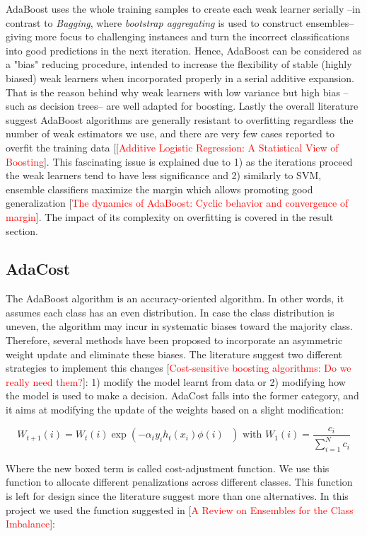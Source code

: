 \documentclass[conference]{IEEEtran}
\begin{document}
AdaBoost uses the whole training samples to create each weak learner serially --in contrast to \textit{Bagging}, where \textit{bootstrap aggregating} is used to construct ensembles-- giving more focus to challenging instances and turn the incorrect classifications into good predictions in the next iteration. Hence, AdaBoost can be considered as a "bias" reducing procedure, intended to increase the flexibility of stable (highly biased) weak learners when incorporated properly in a serial additive expansion. That is the reason behind why weak learners with low variance but high bias --such as decision trees-- are well adapted for boosting. Lastly the overall literature suggest AdaBoost algorithms are generally resistant to overfitting regardless the number of weak estimators we use, and there are very few cases reported to overfit the training data [[\textcolor{red}{Additive Logistic Regression: A Statistical View of Boosting}]. This fascinating issue is explained due to 1) as the iterations proceed the weak learners tend to have less significance and 2) similarly to SVM, ensemble classifiers maximize the margin which allows promoting good generalization [\textcolor{red}{The dynamics of AdaBoost: Cyclic behavior and convergence of margin}]. The impact of its complexity on overfitting is covered in the result section.

\subsection{AdaCost}
The AdaBoost algorithm is an accuracy-oriented algorithm. In other words, it assumes each class has an even distribution. In case the class distribution is uneven, the algorithm may incur in systematic biases toward the majority class. Therefore, several methods have been proposed to incorporate an asymmetric weight update and eliminate these biases. The literature suggest two different strategies to implement this changes [\textcolor{red}{Cost-sensitive boosting algorithms: Do we really need them?}]: 1) modify the model learnt from data or 2) modifying how the model is used to make a decision. AdaCost falls into the former category, and it aims at modifying the update of the weights based on a slight modification:

$$ W_{t+1}(i) = W_t(i) \exp \left(-\alpha_t y_i h_t(x_i) \boxed{\phi(i)} \text{ } \right) \text{  with  } W_1(i) = \frac{c_i}{\sum_{i=1}^Nc_i}$$

Where the new boxed term is called cost-adjustment function. We use this function to allocate different penalizations across different classes. This function is left for design since the literature suggest more than one alternatives. In this project we used the function suggested in [\textcolor{red}{A Review on Ensembles for the Class Imbalance}]: 
\end{document}
